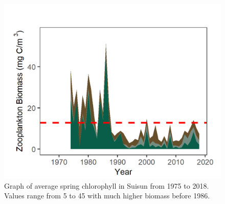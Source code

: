 \documentclass[
]{book}
\begin{document}
\begin{panel-grid}
\begin{columns-nocenter}
\begin{column800}
\begin{expand}
\end{expand}

\end{column800}

\begin{column40}

~

\end{column40}

\begin{column800}

\begin{expand}

\begin{figure}
\includegraphics[width=15.25in]{figures/zoops_ssspring} \caption{Graph of average spring chlorophyll in Suisun from 1975 to 2018. Values range from 5 to 45 with much higher biomass before 1986.}\label{fig:unnamed-chunk-28}
\end{figure}

\end{expand}

\end{column800}

\begin{column40}

~

\end{column40}

\begin{column800}

\begin{expand}


\end{expand}
\end{column800}
\end{columns-nocenter}
\end{panel-grid}
\end{document}
